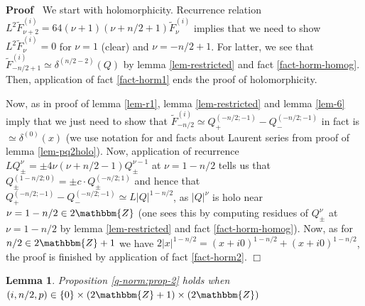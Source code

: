\documentclass{article}
\newenvironment{proof}{\noindent\textbf{Proof\ }}{\hspace*{\fill}$\Box$\medskip}
\numberwithin{definition}{section}
\newtheorem{lemma}{Lemma}
\numberwithin{lemma}{section}
\numberwithin{proposition}{section}
{\theorembodyfont{\rmfamily}\newtheorem{remark}{Remark}
\numberwithin{remark}{section}
}
\begin{document}
\begin{proof}
  We start with holomorphicity. Recurrence relation $L^2 \tilde{F}_{\nu +
  2}^{( i)} = 64 ( \nu + 1) ( \nu + n / 2 + 1) \tilde{F}_{\nu}^{( i)}$ implies
  that we need to show $L^2 \tilde{F}_{\nu}^{( i)} = 0$ for $\nu = 1$ (clear)
  and $\nu = - n / 2 + 1$. For latter, we see that $\tilde{F}^{( i)}_{- n / 2
  + 1} \simeq \delta^{( n / 2 - 2)} ( Q)$ by lemma \ref{lem-restricted} and
  fact \ref{fact-horm-homog}. Then, application of fact \ref{fact-horm1} ends
  the proof of holomorphicity.
  
  Now, as in proof of lemma \ref{lem-r1}, lemma \ref{lem-restricted} and lemma
  \ref{lem-6} imply that we just need to show that $\tilde{F}_{- n / 2}^{( i)}
  \simeq Q_+^{( - n / 2 ; - 1)} - Q_-^{( - n / 2 ; - 1)}$ in fact is $\simeq
  \delta^{( 0)} ( x)$ (we use notation for and facts about Laurent series from
  proof of lemma \ref{lem-pq2holo}). Now, application of recurrence $L
  Q_{\pm}^{\nu} = \pm 4 \nu ( \nu + n / 2 - 1) Q_{\pm}^{\nu - 1}$ at $\nu = 1
  - n / 2$ tells us that $Q_{\pm}^{( 1 - n / 2 ; 0)} = \pm c \cdot Q_{\pm}^{(
  - n / 2 ; 1)}$ and hence that $Q_+^{( - n / 2 ; - 1)} - Q_-^{( - n / 2 ; -
  1)} \simeq L | Q |^{1 - n / 2}$, as $| Q |^{\nu}$ is holo near $\nu = 1 - n
  / 2 \in 2\mathbbm{Z}$ (one sees this by computing residues of
  $Q_{\pm}^{\nu}$ at $\nu = 1 - n / 2$ by lemma \ref{lem-restricted} and fact
  \ref{fact-horm-homog}). Now, as for $n / 2 \in 2\mathbbm{Z}+ 1$ we have $2 |
  x |^{1 - n / 2} = ( x + i 0)^{1 - n / 2} + ( x + i 0)^{1 - n / 2}$, the
  proof is finished by application of fact \ref{fact-horm2}.
\end{proof}

\begin{lemma}
  \label{lem-r2}Proposition \ref{q-norm:prop-2} holds when $( i, n / 2, p) \in
  \{ 0 \} \times ( 2\mathbbm{Z}+ 1) \times ( 2\mathbbm{Z})$
\end{lemma}
\end{document}
